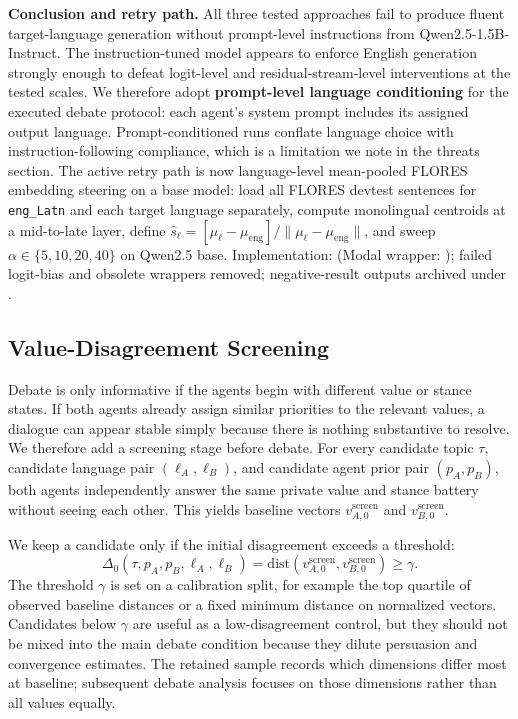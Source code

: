 \documentclass{article}
\begin{document}
\textbf{Conclusion and retry path.} All three tested approaches fail to produce fluent target-language generation without prompt-level instructions from Qwen2.5-1.5B-Instruct. The instruction-tuned model appears to enforce English generation strongly enough to defeat logit-level and residual-stream-level interventions at the tested scales. We therefore adopt \textbf{prompt-level language conditioning} for the executed debate protocol: each agent's system prompt includes its assigned output language. Prompt-conditioned runs conflate language choice with instruction-following compliance, which is a limitation we note in the threats section. The active retry path is now language-level mean-pooled FLORES embedding steering on a base model: load all FLORES devtest sentences for \texttt{eng\_Latn} and each target language separately, compute monolingual centroids at a mid-to-late layer, define $\hat{s}_\ell = [\mu_\ell - \mu_{\mathrm{eng}}] / \|\mu_\ell - \mu_{\mathrm{eng}}\|$, and sweep $\alpha \in \{5,10,20,40\}$ on Qwen2.5 base. Implementation:  (Modal wrapper: ); failed logit-bias and obsolete wrappers removed; negative-result outputs archived under .

\subsection{Value-Disagreement Screening}
\label{sec:screening}

Debate is only informative if the agents begin with different value or stance states. If both agents already assign similar priorities to the relevant values, a dialogue can appear stable simply because there is nothing substantive to resolve. We therefore add a screening stage before debate. For every candidate topic $\tau$, candidate language pair $(\ell_A,\ell_B)$, and candidate agent prior pair $(p_A,p_B)$, both agents independently answer the same private value and stance battery without seeing each other. This yields baseline vectors $v_{A,0}^{\mathrm{screen}}$ and $v_{B,0}^{\mathrm{screen}}$.

We keep a candidate only if the initial disagreement exceeds a threshold:
\begin{equation}
\Delta_0(\tau,p_A,p_B,\ell_A,\ell_B)
= \mathrm{dist}(v_{A,0}^{\mathrm{screen}}, v_{B,0}^{\mathrm{screen}}) \geq \gamma.
\end{equation}
The threshold $\gamma$ is set on a calibration split, for example the top quartile of observed baseline distances or a fixed minimum distance on normalized vectors. Candidates below $\gamma$ are useful as a low-disagreement control, but they should not be mixed into the main debate condition because they dilute persuasion and convergence estimates. The retained sample records which dimensions differ most at baseline; subsequent debate analysis focuses on those dimensions rather than all values equally.
\end{document}
